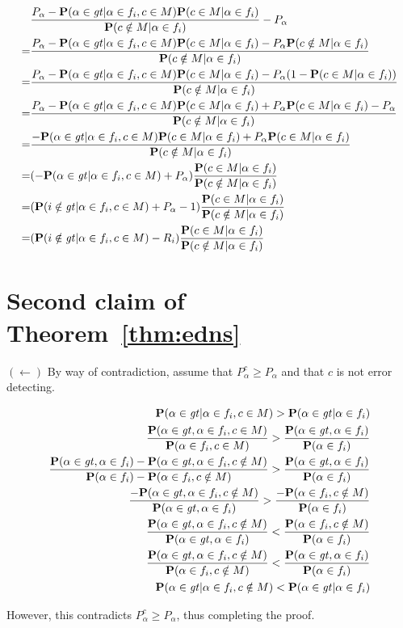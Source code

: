 \begin{eqnarray*}
&\frac{P_\alpha-\Pr(\leg | \lefi, \c)\Pr(\c | \lefi)}{\Pr(\notc | \lefi)}-P_\alpha\\
=&\frac{P_\alpha-\Pr(\leg | \lefi, \c)\Pr(\c | \lefi)-P_\alpha\Pr(\notc | \lefi)}{\Pr(\notc | \lefi)}\\
=&\frac{P_\alpha-\Pr(\leg | \lefi, \c)\Pr(\c | \lefi)-P_\alpha(1-\Pr(\c | \lefi))}{\Pr(\notc | \lefi)}\\
=&\frac{P_\alpha-\Pr(\leg | \lefi, \c)\Pr(\c | \lefi)+P_\alpha\Pr(\c | \lefi)-P_\alpha}{\Pr(\notc | \lefi)}\\
=&\frac{-\Pr(\leg | \lefi, \c)\Pr(\c | \lefi)+P_\alpha\Pr(\c | \lefi)}{\Pr(\notc | \lefi)}\\
=&(-\Pr(\leg | \lefi, \c)+P_\alpha)\frac{\Pr(\c | \lefi)}{\Pr(\notc | \lefi)}\\
=&(\Pr(i \notin \gt | \lefi, \c)+P_\alpha-1)\frac{\Pr(\c | \lefi)}{\Pr(\notc | \lefi)}\\
=&(\Pr(i \notin \gt | \lefi, \c)-R_i)\frac{\Pr(\c | \lefi)}{\Pr(\notc | \lefi)}\\
\end{eqnarray*}

\section{Second claim of Theorem~\ref{thm:edns}}
\noindent$(\leftarrow)$ By way of contradiction, assume that $P_\alpha^c \geq P_\alpha$ and that $c$ is not error detecting.
\begin{scriptsize}
\begin{eqnarray*}
\Pr(\legi|\lefi,\c)> \Pr(\legi|\lefi)\\
\frac{\Pr(\legi,\lefi,\c)}{\Pr(\lefi,\c)}>\frac{\Pr(\legi,\lefi)}{\Pr(\lefi)}\\
\frac{\Pr(\legi,\lefi)-\Pr(\legi,\lefi,\notc)}{\Pr(\lefi)-\Pr(\lefi,\notc)}>\frac{\Pr(\legi,\lefi)}{\Pr(\lefi)}\\
\frac{-\Pr(\legi,\lefi,\notc)}{\Pr(\legi,\lefi)}>\frac{-\Pr(\lefi,\notc)}{\Pr(\lefi)}\\
\frac{\Pr(\legi,\lefi,\notc)}{\Pr(\legi,\lefi)}<\frac{\Pr(\lefi,\notc)}{\Pr(\lefi)}\\
\frac{\Pr(\legi,\lefi,\notc)}{\Pr(\lefi,\notc)}<\frac{\Pr(\legi,\lefi)}{\Pr(\lefi)}\\
\Pr(\legi|\lefi,\notc)<\Pr(\legi|\lefi)
\end{eqnarray*}
\end{scriptsize}

However, this contradicts $P_\alpha^c \geq P_\alpha$, thus completing the proof.



